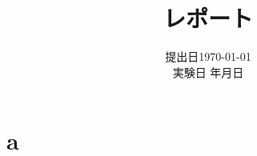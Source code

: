 \documentclass[a4paper,10pt,titlepage,dvipdfmx]{jsarticle}
\title{レポート}
\author{}
\date{提出日\today\\実験日 年月日}
\begin{document}
\maketitle
\section{a}
\end{document}
